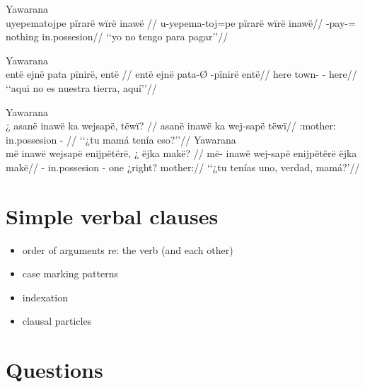 \documentclass{memoir}
\begin{document}
\ex Yawarana \\
\label{poss-main-neg-advsubj-pirare-locpred}    \begingl
    \glpreamble uyepematojpe pïrarë wïrë inawë //
    \gla u-yepema-toj=pe pïrarë wïrë inawë//
    \glb {}-pay-= nothing  in.possesion//
        \glft ‘‘yo no tengo para pagar’’//  
    \endgl 
\xe

\ex Yawarana \\
\label{poss-main-neg-part-pinire-nsubj}    \begingl
    \glpreamble entë ejnë pata pïnirë, entë //
    \gla entë ejnë pata-Ø -pïnirë entë//
    \glb here  town- - here//
        \glft ‘‘aqui no es nuestra tierra, aquí’’//  
    \endgl 
\xe

\pex\label{poss-main-q-locpred-cop-nsubj}    \a Yawarana\\
    \label{convamgu-325}        \begingl
        \glpreamble ¿ asanë inawë ka wejsapë, tëwï? //
        \gla asanë inawë ka wej-sapë tëwï//
        \glb {}:mother: in.possesion  - //
            \glft ‘‘¿tu mamá tenía eso?’’//  
        \endgl 
    \a Yawarana\\
    \label{histyarirdi-827}        \begingl
        \glpreamble më inawë wejsapë enijpëtërë, ¿ ëjka makë? //
        \gla më- inawë wej-sapë enijpëtërë ëjka makë//
        \glb {}- in.possesion - one ¿right? mother://
            \glft ‘‘¿tu tenías uno, verdad, mamá?’//  
        \endgl 
\xe

\chapter{\texorpdfstring{Simple verbal clauses
\label{simpleverb}}{Simple verbal clauses }}


\begin{itemize}
\tightlist
\item
  order of arguments re: the verb (and each other)
\item
  case marking patterns
\item
  indexation
\item
  clausal particles
\end{itemize}

\chapter{\texorpdfstring{Questions \label{questions}}{Questions }}
\end{document}
